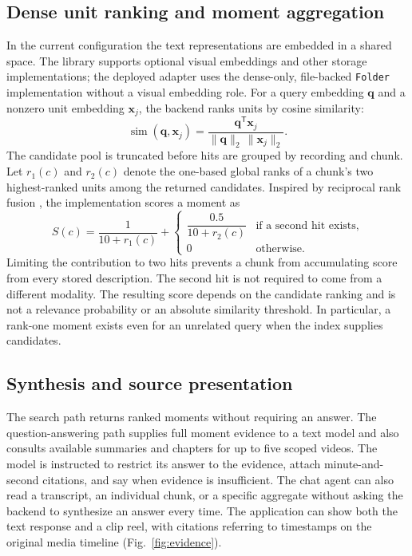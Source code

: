 \documentclass{ieeeaccess}
\begin{document}
\subsection{Dense unit ranking and moment aggregation}
In the current configuration the text representations are embedded in a shared space. The library supports optional visual embeddings and other storage implementations; the deployed adapter uses the dense-only, file-backed \texttt{Folder} implementation without a visual embedding role. For a query embedding $\mathbf{q}$ and a nonzero unit embedding $\mathbf{x}_j$, the backend ranks units by cosine similarity:
\begin{equation}
\operatorname{sim}(\mathbf{q},\mathbf{x}_j)=
\frac{\mathbf{q}^{\mathsf T}\mathbf{x}_j}
{\lVert\mathbf{q}\rVert_2\,\lVert\mathbf{x}_j\rVert_2}.
\label{eq:cosine}
\end{equation}
The candidate pool is truncated before hits are grouped by recording and chunk. Let $r_1(c)$ and $r_2(c)$ denote the one-based global ranks of a chunk's two highest-ranked units among the returned candidates. Inspired by reciprocal rank fusion \cite{rrf}, the implementation scores a moment as
\begin{equation}
S(c)=\frac{1}{10+r_1(c)}+
\begin{cases}
\dfrac{0.5}{10+r_2(c)} & \text{if a second hit exists},\\[3pt]
0 & \text{otherwise}.
\end{cases}
\label{eq:rank}
\end{equation}
Limiting the contribution to two hits prevents a chunk from accumulating score from every stored description. The second hit is not required to come from a different modality. The resulting score depends on the candidate ranking and is not a relevance probability or an absolute similarity threshold. In particular, a rank-one moment exists even for an unrelated query when the index supplies candidates.

\subsection{Synthesis and source presentation}
The search path returns ranked moments without requiring an answer. The question-answering path supplies full moment evidence to a text model and also consults available summaries and chapters for up to five scoped videos. The model is instructed to restrict its answer to the evidence, attach minute-and-second citations, and say when evidence is insufficient. The chat agent can also read a transcript, an individual chunk, or a specific aggregate without asking the backend to synthesize an answer every time. The application can show both the text response and a clip reel, with citations referring to timestamps on the original media timeline (Fig.~\ref{fig:evidence}).
\end{document}
